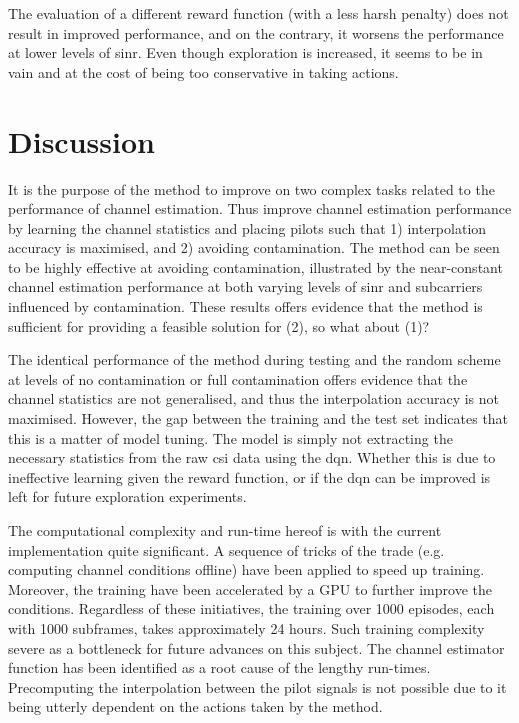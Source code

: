 The evaluation of a different reward function (with a less harsh penalty) does not result in improved performance, and on the contrary, it worsens the performance at lower levels of \gls{sinr}. Even though exploration is increased, it seems to be in vain and at the cost of being too conservative in taking actions.
\section{Discussion}
It is the purpose of the method to improve on two complex tasks related to the performance of channel estimation. Thus improve channel estimation performance by learning the channel statistics and placing pilots such that 1) interpolation accuracy is maximised, and 2) avoiding contamination. The method can be seen to be highly effective at avoiding contamination, illustrated by the near-constant channel estimation performance at both varying levels of \gls{sinr} and subcarriers influenced by contamination. These results offers evidence that the method is sufficient for providing a feasible solution for (2), so what about (1)? 

The identical performance of the method during testing and the random scheme at levels of no contamination or full contamination offers evidence that the channel statistics are not generalised, and thus the interpolation accuracy is not maximised. However, the gap between the training and the test set indicates that this is a matter of model tuning. The model is simply not extracting the necessary statistics from the raw \gls{csi} data using the \gls{dqn}. Whether this is due to ineffective learning given the reward function, or if the \gls{dqn} can be improved is left for future exploration experiments.

The computational complexity and run-time hereof is with the current implementation quite significant. A sequence of tricks of the trade (e.g. computing channel conditions offline) have been applied to speed up training. Moreover, the training have been accelerated by a GPU to further improve the conditions. Regardless of these initiatives, the training over 1000 episodes, each with 1000 subframes, takes approximately 24 hours. Such training complexity severe as a bottleneck for future advances on this subject. The channel estimator function has been identified as a root cause of the lengthy run-times. Precomputing the interpolation between the pilot signals is not possible due to it being utterly dependent on the actions taken by the method.




